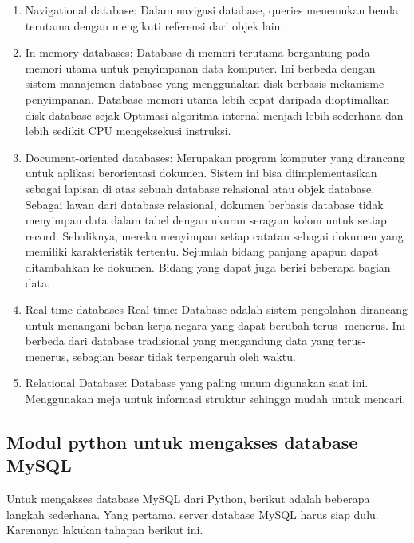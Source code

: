\begin{enumerate}
		\item Navigational database: 
			Dalam navigasi database, queries menemukan benda terutama dengan mengikuti referensi dari objek lain.
 
		\item In-memory databases: 
			Database di memori terutama bergantung pada memori utama untuk penyimpanan data komputer. Ini berbeda dengan sistem manajemen database yang menggunakan disk berbasis mekanisme penyimpanan. Database memori utama lebih cepat daripada dioptimalkan disk database sejak Optimasi algoritma internal menjadi lebih sederhana dan lebih sedikit CPU mengeksekusi instruksi.

		\item Document-oriented databases: 
			Merupakan program komputer yang dirancang untuk aplikasi berorientasi dokumen. Sistem ini bisa diimplementasikan sebagai lapisan di atas sebuah database relasional atau objek database. Sebagai lawan dari database relasional, dokumen berbasis database tidak menyimpan data dalam tabel dengan ukuran seragam kolom untuk setiap record. Sebaliknya, mereka menyimpan setiap catatan sebagai dokumen yang memiliki karakteristik tertentu. Sejumlah bidang panjang apapun dapat ditambahkan ke dokumen. Bidang yang dapat juga berisi beberapa bagian data. 
 
		\item Real-time databases Real-time: 
			Database adalah sistem pengolahan dirancang untuk menangani beban kerja negara yang dapat berubah terus- menerus. Ini berbeda dari database tradisional yang mengandung data yang terus- menerus, sebagian besar tidak terpengaruh oleh waktu. 
 
		\item Relational Database: 
			Database yang paling umum digunakan saat ini. Menggunakan meja untuk informasi struktur sehingga mudah untuk mencari.
	\end{enumerate}
 
 
\subsection {Modul python untuk mengakses database MySQL}
	Untuk mengakses database MySQL dari Python, berikut adalah beberapa langkah sederhana. Yang pertama, server database MySQL harus siap dulu. Karenanya lakukan tahapan berikut ini. 

